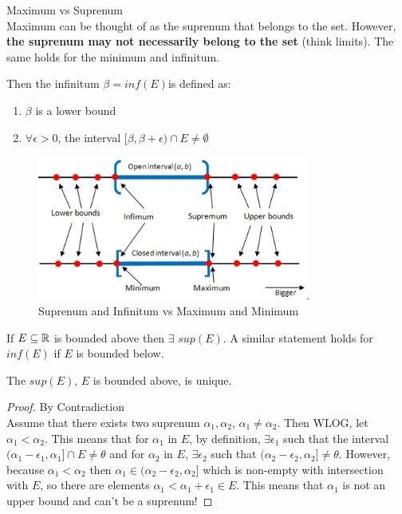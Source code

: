 \documentclass[a4paper]{article}
\begin{document}
\begin{remark}{Maximum vs Suprenum} \\
  Maximum can be thought of as the suprenum that belongs to the set. However, \textbf{the suprenum may not 
  necessarily belong to the set} (think limits). The same holds for the minimum and infinitum.
\end{remark}

\begin{definition}
  Then the infinitum $\beta = inf(E)$is defined as:
  \begin{enumerate}
    \item $\beta$ is a lower bound
    \item  $\forall \epsilon > 0$, the interval  $[\beta, \beta + \epsilon) \cap E \neq \emptyset$ 
  \end{enumerate}
\end{definition}

\begin{figure}[h]
  \centering
  \includegraphics[width=0.8\textwidth]{assets/sup_inf_ex.png}
  \caption{Suprenum and Infinitum vs Maximum and Minimum}
  \label{fig:sup_inf_ex}
\end{figure}

\begin{theorem}
  If $E \subseteq \mathbb{R}$ is bounded above then $\exists $ $sup(E)$. A similar statement holds for  $inf(E)$ 
  if  $E$ is bounded below.
\end{theorem}

\begin{prop}
The $sup(E)$,  $E$ is bounded above, is unique.
\begin{proof}{By Contradiction} \\
  Assume that there exists two suprenum $\alpha_1, \alpha_2$, $\alpha_1 \neq \alpha_2$. Then WLOG, let
  $\alpha_1 < \alpha_2$. This means that for $\alpha_1$ in  $E$, by definition,  $\exists \epsilon_1$ 
  such that the interval $(\alpha_1 - \epsilon_1, \alpha_1] \cap E \neq \theta$ and for $\alpha_2$ in $E$,
  $\exists \epsilon_2$ such that $( \alpha_2 - \epsilon_2, \alpha_2 ] \neq \theta$. However, because 
  $\alpha_1 < \alpha_2$ then $\alpha_1 \in ( \alpha_2 - \epsilon_2, \alpha_2 ]$ which is non-empty with intersection
  with $E$, so there are elements  $\alpha_1 < \alpha_1 + \epsilon_1 \in E$. This means that $\alpha_1$ 
  is not an upper bound and can't be a suprenum! 
\end{proof}
\end{prop}
\end{document}
